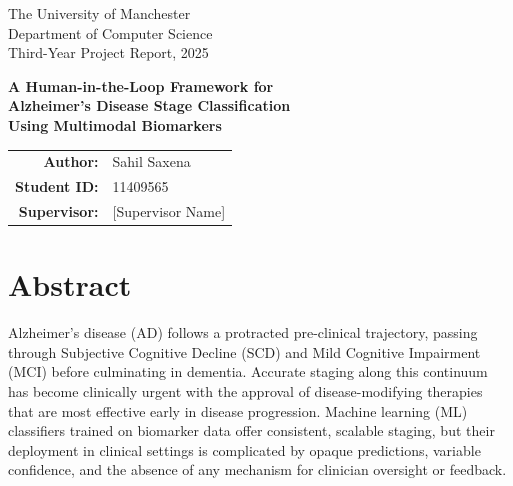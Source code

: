 \documentclass[12pt, a4paper]{report}
\begin{document}

  \begin{titlepage}
    \centering
    \vspace*{3cm}

    {\normalsize The University of Manchester\\
    Department of Computer Science\\[0.4em]
    Third-Year Project Report, 2025}

    \vspace{2cm}

    {\LARGE \textbf{A Human-in-the-Loop Framework for\\[0.3em]
    Alzheimer's Disease Stage Classification\\[0.3em]
    Using Multimodal Biomarkers}}

    \vspace{2cm}

    {\normalsize
    \begin{tabular}{rl}
      \textbf{Author:}     & Sahil Saxena\\[0.4em]
      \textbf{Student ID:} & 11409565\\[0.4em]
      \textbf{Supervisor:} & [Supervisor Name]
    \end{tabular}}

  \end{titlepage}


  \chapter*{Abstract}

  Alzheimer's disease (AD) follows a protracted pre-clinical trajectory, passing
  through Subjective Cognitive Decline (SCD) and Mild Cognitive Impairment (MCI)
  before culminating in dementia. Accurate staging along this continuum has become
  clinically urgent with the approval of disease-modifying therapies that are most
  effective early in disease progression. Machine learning (ML) classifiers trained
  on biomarker data offer consistent, scalable staging, but their deployment in
  clinical settings is complicated by opaque predictions, variable confidence, and
  the absence of any mechanism for clinician oversight or feedback.
\end{document}
